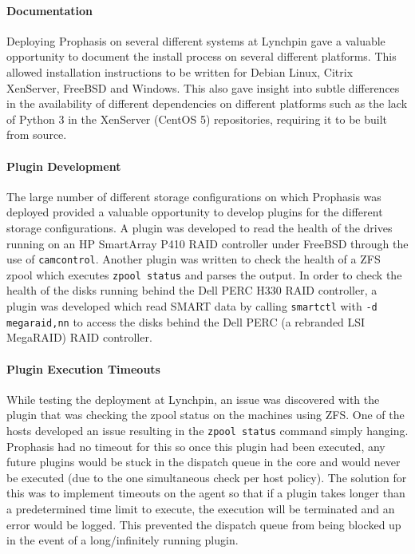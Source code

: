 \documentclass[bsc,logo,twoside,parskip,singlespacing,notimes]{infthesis}
\begin{document}
\paragraph*{Documentation}
	Deploying Prophasis on several different systems at Lynchpin gave a valuable
	opportunity to document the install process on several different platforms.
	This allowed installation instructions to be written for Debian Linux,
	Citrix XenServer, FreeBSD and Windows.  This also gave insight into subtle
	differences in the availability of different dependencies on different
	platforms such as the lack of Python 3 in the XenServer (CentOS 5)
	repositories, requiring it to be built from source.

\paragraph*{Plugin Development}
	The large number of different storage configurations on which Prophasis was
	deployed provided a valuable opportunity to develop plugins for the different
	storage configurations.  A plugin was developed to read the health of the
	drives running on an HP SmartArray P410 RAID controller under FreeBSD through
	the use of \texttt{camcontrol}.  Another plugin was written to check the
	health of a ZFS zpool which executes \texttt{zpool status} and parses the
	output.  In order to check the health of the disks running behind the Dell PERC
	H330 RAID controller, a plugin was developed which read SMART data by calling
	\texttt{smartctl} with \texttt{-d megaraid,nn} to access the disks behind the
	Dell PERC (a rebranded LSI MegaRAID) RAID controller.

\paragraph*{Plugin Execution Timeouts}
	While testing the deployment at Lynchpin, an issue was discovered with the
	plugin that was checking the zpool status on the machines using ZFS. One of the
	hosts developed an issue resulting in the \texttt{zpool status} command simply
	hanging.  Prophasis had no timeout for this so once this plugin had been
	executed, any future plugins would be stuck in the dispatch queue in the core
	and would never be executed (due to the one simultaneous check per host
	policy).  The solution for this was to implement timeouts on the agent so that
	if a plugin takes longer than a predetermined time limit to execute, the
	execution will be terminated and an error would be logged.  This prevented
	the dispatch queue from being blocked up in the event of a long/infinitely
	running plugin.
\end{document}
